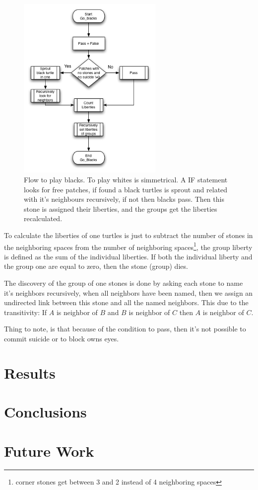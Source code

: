 \documentclass[a4paper,10pt,twocolumn]{article}
\begin{document}
\begin{CJK*}{UTF8}{gbsn}
\begin{figure}[!ht]
\begin{center}
\includegraphics[width=7cm]{go_blacks.png}
\caption{\footnotesize Flow to play blacks. To play whites is simmetrical. A IF statement looks for free patches, if found a black turtles is sprout and related with it's neighbours recursively, if not then blacks pass. Then this stone is assigned their liberties, and the groups get the liberties recalculated.\label{d2}}
\end{center}
\end{figure}

To calculate the liberties of one turtles is just to subtract the number of stones in the neighboring spaces from the number of neighboring spaces\footnote{corner stones get between 3 and 2 instead of 4 neighboring spaces}, the group liberty is defined as the sum of the individual liberties. If both the individual liberty and the group one are equal to zero, then the stone (group) dies. 

The discovery of the group of one stones is done by asking each stone to name it's neighbors recursively, when all neighbors have been named, then we assign an undirected link between this stone and all the named neighbors. This due to the transitivity: If $A$ is neighbor of $B$ and $B$ is neighbor of $C$ then $A$ is neighbor of $C$.

Thing to note, is that because of the condition to pass, then it's not possible to commit suicide or to block owns eyes. 

\section{Results}

\section{Conclusions}

\section{Future Work}





\end{CJK*}
\end{document}

